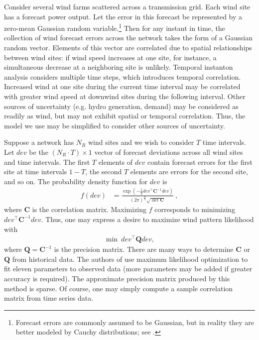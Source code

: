 \documentclass[journal,twoside]{IEEEtran}
\begin{document}
Consider several wind farms scattered across a transmission grid. Each wind site has a forecast power output. Let the error in this forecast be represented by a zero-mean Gaussian random variable.\footnote{Forecast errors are commonly assumed to be Gaussian, but in reality they are better modeled by Cauchy distributions; see \cite{hodge2011}.} Then for any instant in time, the collection of wind forecast errors across the network takes the form of a Gaussian random vector. Elements of this vector are correlated due to spatial relationships between wind sites: if wind speed increases at one site, for instance, a simultaneous decrease at a neighboring site is unlikely. Temporal instanton analysis considers multiple time steps, which introduces temporal correlation. Increased wind at one site during the current time interval may be correlated with greater wind speed at downwind sites during the following interval. Other sources of uncertainty (e.g. hydro generation, demand) may be considered as readily as wind, but may not exhibit spatial or temporal correlation. Thus, the model we use may be simplified to consider other sources of uncertainty.

Suppose a network has $N_R$ wind sites and we wish to consider $T$ time intervals. Let $dev$ be the $(N_R\cdot T)\times 1$ vector of forecast deviations across all wind sites and time intervals. The first $T$ elements of $dev$ contain forecast errors for the first site at time intervals $1-T$, the second $T$ elements are errors for the second site, and so on. The probability density function for $dev$ is
\begin{align*}
f(dev) &= \frac{\exp \left(-\frac{1}{2} dev^\top \mathbf{C}^{-1} dev \right)}{(2\pi)^{\frac{n}{2}}\sqrt{\det \mathbf{C}}}~,
\end{align*}
where $\mathbf{C}$ is the correlation matrix. Maximizing $f$ corresponds to minimizing $dev^\top \mathbf{C}^{-1} dev$. Thus, one may express a desire to maximize wind pattern likelihood with
\begin{align}
\label{eq:obj}\min~ dev^\top \mathbf{Q} dev,
\end{align}
where $\mathbf{Q}=\mathbf{C}^{-1}$ is the precision matrix. There are many ways to determine $\mathbf{C}$ or $\mathbf{Q}$ from historical data. The authors of \cite{tastu2015} use maximum likelihood optimization to fit eleven parameters to observed data (more parameters may be added if greater accuracy is required). The approximate precision matrix produced by this method is sparse. Of course, one may simply compute a sample correlation matrix from time series data.
\end{document}
